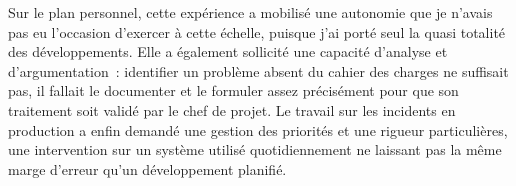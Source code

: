 Sur le plan personnel, cette expérience a mobilisé une autonomie que je n'avais
pas eu l'occasion d'exercer à cette échelle, puisque j'ai porté seul la quasi
totalité des développements. Elle a également sollicité une capacité d'analyse
et d'argumentation~: identifier un problème absent du cahier des charges ne
suffisait pas, il fallait le documenter et le formuler assez précisément pour
que son traitement soit validé par le chef de projet. Le travail sur les
incidents en production a enfin demandé une gestion des priorités et une rigueur
particulières, une intervention sur un système utilisé quotidiennement ne
laissant pas la même marge d'erreur qu'un développement planifié.

